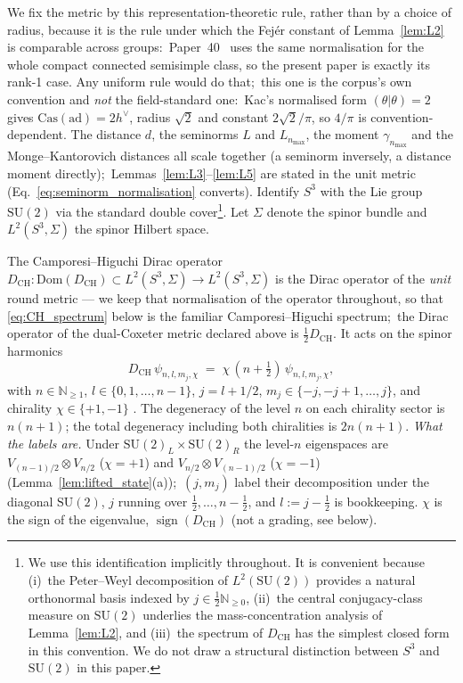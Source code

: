 \documentclass[11pt,a4paper]{article}
\theoremstyle{plain}
\theoremstyle{definition}
\newcommand{\nmax}{n_{\max}}
\newcommand{\sthree}{S^{3}}
\newcommand{\N}{\mathbb{N}}
\newcommand{\SU}{\mathrm{SU}}
\newcommand{\DCH}{D_{\mathrm{CH}}}
\begin{document}
We fix the metric by this representation-theoretic rule, rather than by
a choice of radius, because it is the rule under which the Fej\'er
constant of Lemma~\ref{lem:L2} is comparable across groups:\
Paper~40~\cite{paper40_unified} uses the same normalisation for the
whole compact connected semisimple class, so the present paper is
exactly its rank-1 case.  Any uniform rule would do that;\ this one
is the corpus's own convention and \emph{not} the field-standard one:\
Kac's normalised form $(\theta|\theta) = 2$~\cite{kac1990} gives $\mathrm{Cas}(\mathrm{ad})
= 2h^\vee$, radius $\sqrt2$ and constant $2\sqrt2/\pi$, so $4/\pi$ is
convention-dependent.  The distance $d$, the seminorms $L$ and
$L_{\nmax}$, the moment $\gamma_{\nmax}$ and the Monge--Kantorovich
distances all scale together (a seminorm inversely, a distance moment
directly);\ Lemmas~\ref{lem:L3}--\ref{lem:L5} are stated in the unit
metric (Eq.~\eqref{eq:seminorm_normalisation} converts).  Identify $\sthree$
with the Lie group $\SU(2)$ via the standard double cover\footnote{We
use this identification implicitly throughout. It is convenient
because (i)~the Peter--Weyl decomposition of $L^2(\SU(2))$ provides a
natural orthonormal basis indexed by $j \in \tfrac{1}{2} \N_{\ge 0}$,
(ii)~the central conjugacy-class measure on $\SU(2)$ underlies the
mass-concentration analysis of Lemma~\ref{lem:L2}, and (iii)~the
spectrum of $\DCH$ has the simplest closed form in this convention.
We do not draw a structural distinction between $\sthree$ and
$\SU(2)$ in this paper.}. Let $\Sigma$ denote the spinor bundle and
$L^2(\sthree, \Sigma)$ the spinor Hilbert space.

The Camporesi--Higuchi Dirac operator
$\DCH: \mathrm{Dom}(\DCH) \subset L^2(\sthree, \Sigma) \to L^2(\sthree,
\Sigma)$ is the Dirac operator of the \emph{unit} round metric --- we
keep that normalisation of the operator throughout, so that
\eqref{eq:CH_spectrum} below is the familiar Camporesi--Higuchi
spectrum;\ the Dirac operator of the dual-Coxeter metric declared above
is $\tfrac{1}{2}\DCH$.  It acts on the spinor harmonics
\begin{equation}\label{eq:CH_spectrum}
   \DCH \, \psi_{n, l, m_j, \chi}
   \;=\; \chi\,(n + \tfrac{1}{2})\, \psi_{n, l, m_j, \chi},
\end{equation}
with $n \in \N_{\ge 1}$, $l \in \{0, 1, \ldots, n-1\}$, $j = l + 1/2$,
$m_j \in \{-j, -j+1, \ldots, j\}$, and chirality $\chi \in \{+1, -1\}$
\cite[\S 3]{camporesi_higuchi1996}. The degeneracy of the level
$n$ on each chirality sector is $n(n+1)$; the total degeneracy
including both chiralities is $2n(n+1)$.  \emph{What the labels are.}  Under $\SU(2)_L \times \SU(2)_R$ the level-$n$
eigenspaces are $V_{(n-1)/2} \otimes V_{n/2}$ ($\chi = +1$) and
$V_{n/2} \otimes V_{(n-1)/2}$ ($\chi = -1$)
(Lemma~\ref{lem:lifted_state}(a));\ $(j, m_j)$ label their decomposition
under the diagonal $\SU(2)$, $j$ running over $\tfrac12, \ldots, n -
\tfrac12$, and $l := j - \tfrac12$ is bookkeeping.  $\chi$ is the sign of
the eigenvalue, $\operatorname{sign}(\DCH)$ (not a grading, see below).
\end{document}
